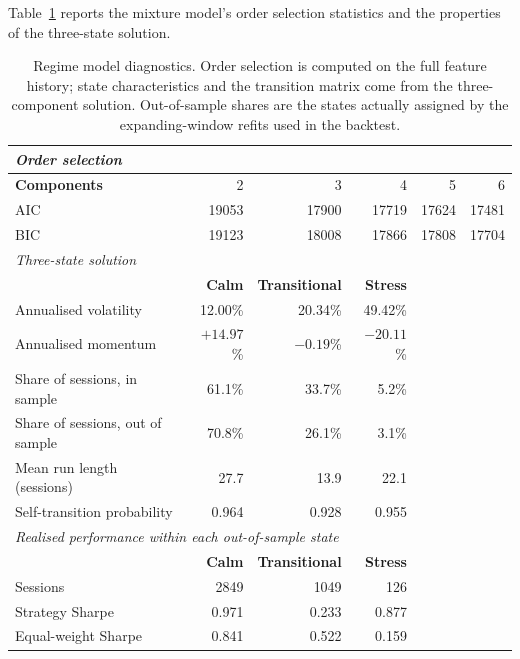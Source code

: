 Table~\ref{tab:regimefit} reports the mixture model's order selection statistics and the properties of
the three-state solution.

\begin{table}[!ht]
\centering
\caption{Regime model diagnostics. Order selection is computed on the full feature
history; state characteristics and the transition matrix come from the three-component
solution. Out-of-sample shares are the states actually assigned by the expanding-window
refits used in the backtest.}
\label{tab:regimefit}
\small
\begin{tabular}{p{3.2cm}rrrrr}
\hline
\multicolumn{6}{l}{\textit{Order selection}} \\
\hline
\textbf{Components} & 2 & 3 & 4 & 5 & 6 \\
AIC & 19053 & 17900 & 17719 & 17624 & 17481 \\
BIC & 19123 & 18008 & 17866 & 17808 & 17704 \\
\hline
\multicolumn{6}{l}{\textit{Three-state solution}} \\
\hline
& \textbf{Calm} & \textbf{Transitional} & \textbf{Stress} & & \\
Annualised volatility & 12.00\% & 20.34\% & 49.42\% & & \\
Annualised momentum & $+14.97$\% & $-0.19$\% & $-20.11$\% & & \\
Share of sessions, in sample & 61.1\% & 33.7\% & 5.2\% & & \\
Share of sessions, out of sample & 70.8\% & 26.1\% & 3.1\% & & \\
Mean run length (sessions) & 27.7 & 13.9 & 22.1 & & \\
Self-transition probability & 0.964 & 0.928 & 0.955 & & \\
\hline
\multicolumn{6}{l}{\textit{Realised performance within each out-of-sample state}} \\
\hline
& \textbf{Calm} & \textbf{Transitional} & \textbf{Stress} & & \\
Sessions & 2849 & 1049 & 126 & & \\
Strategy Sharpe & 0.971 & 0.233 & 0.877 & & \\
Equal-weight Sharpe & 0.841 & 0.522 & 0.159 & & \\
\hline
\end{tabular}
\end{table}

